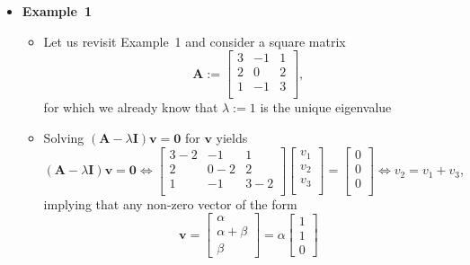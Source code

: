 \documentclass[12pt,a4paper]{article}
\begin{document}
\begin{itemize}
\item \textbf{Example~1}

  \begin{itemize}
  \item Let us revisit Example~1 and consider a square matrix
    \begin{equation}\nonumber%
      \bm{A} :=
      \begin{bmatrix}
        3 & -1 & 1 \\
        2 & 0 & 2 \\
        1 & -1 & 3 \\
      \end{bmatrix},
    \end{equation}
    for which we already know that
    $\lambda:=1$ is the unique eigenvalue
  \item Solving $(\bm{A}-\lambda \bm{I})\bm{v} = \bm{0}$ for $\bm{v}$ yields
    \begin{equation}\nonumber%
      (\bm{A}-\lambda \bm{I})\bm{v} = \bm{0}
      \iff
      \begin{bmatrix}
        3-2 & -1 & 1 \\
        2 & 0-2 & 2 \\
        1 & -1 & 3-2 \\
      \end{bmatrix}
      \begin{bmatrix}
        v_{1} \\
        v_{2} \\
        v_{3} \\
      \end{bmatrix}
      =
      \begin{bmatrix}
        0 \\
        0 \\
        0 \\
      \end{bmatrix}
      \iff
      v_{2} = v_{1} + v_{3},
    \end{equation}
    implying that any non-zero vector of the form
    \begin{equation}\nonumber%
      \bm{v}
      =
      \begin{bmatrix}
        \alpha \\ \alpha + \beta \\ \beta
      \end{bmatrix}
      =
      \alpha
      \begin{bmatrix}
        1 \\ 1 \\ 0

\end{bmatrix}
\end{equation}
\end{itemize}
\end{itemize}
\end{document}

